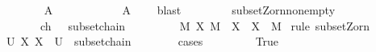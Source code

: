 \begin{isabellebody}
\ \ \ \ \ \ \isamarkupfalse%
\ {\isachardoublequoteopen}A\ {\isasymsubseteq}\ {\isasymUnion}{\isasymF}{\isachardoublequoteclose}\isanewline
\ \ \ \ \ \ \ \ \isamarkupfalse%
\ {\isacartoucheopen}A\ {\isasymsubseteq}\ {\isasymUnion}{\isasymF}{\isacartoucheclose}\ \isamarkupfalse%
\ blast\isanewline
\ \ \ \ \isamarkupfalse%
\isanewline
\ \ \isamarkupfalse%
\isanewline
{}\isamarkupfalse%
%
\endisatagproof
{\isafoldproof}%
%
\isadelimproof
\isanewline
%
\endisadelimproof
\isanewline
{}\isamarkupfalse%
\ subset{\isacharunderscore}{\kern0pt}Zorn{\isacharunderscore}{\kern0pt}nonempty{\isacharcolon}{\kern0pt}\isanewline
\ \ \ {\isachardoublequoteopen}{\isasymA}\ {\isasymnoteq}\ {\isacharbraceleft}{\kern0pt}{\isacharbraceright}{\kern0pt}{\isachardoublequoteclose}\ \ ch{\isacharcolon}{\kern0pt}\ {\isachardoublequoteopen}{\isasymAnd}{\isasymC}{\isachardot}{\kern0pt}\ {\isasymlbrakk}{\isasymC}{\isasymnoteq}{\isacharbraceleft}{\kern0pt}{\isacharbraceright}{\kern0pt}{\isacharsemicolon}{\kern0pt}\ subset{\isachardot}{\kern0pt}chain\ {\isasymA}\ {\isasymC}{\isasymrbrakk}\ {\isasymLongrightarrow}\ {\isasymUnion}{\isasymC}\ {\isasymin}\ {\isasymA}{\isachardoublequoteclose}\isanewline
\ \ \ {\isachardoublequoteopen}{\isasymexists}M{\isasymin}{\isasymA}{\isachardot}{\kern0pt}\ {\isasymforall}X{\isasymin}{\isasymA}{\isachardot}{\kern0pt}\ M\ {\isasymsubseteq}\ X\ {\isasymlongrightarrow}\ X\ {\isacharequal}{\kern0pt}\ M{\isachardoublequoteclose}\isanewline
%
\isadelimproof
%
\endisadelimproof
%
\isatagproof
{}\isamarkupfalse%
\ {\isacharparenleft}{\kern0pt}rule\ subset{\isacharunderscore}{\kern0pt}Zorn{\isacharparenright}{\kern0pt}\isanewline
\ \ \isamarkupfalse%
\ {\isachardoublequoteopen}{\isasymexists}U{\isasymin}{\isasymA}{\isachardot}{\kern0pt}\ {\isasymforall}X{\isasymin}{\isasymC}{\isachardot}{\kern0pt}\ X\ {\isasymsubseteq}\ U{\isachardoublequoteclose}\ \ {\isachardoublequoteopen}subset{\isachardot}{\kern0pt}chain\ {\isasymA}\ {\isasymC}{\isachardoublequoteclose}\ \ {\isasymC}\isanewline
\ \ \isamarkupfalse%
\ {\isacharparenleft}{\kern0pt}cases\ {\isachardoublequoteopen}{\isasymC}\ {\isacharequal}{\kern0pt}\ {\isacharbraceleft}{\kern0pt}{\isacharbraceright}{\kern0pt}{\isachardoublequoteclose}{\isacharparenright}{\kern0pt}\isanewline
\ \ \ \ \isamarkupfalse%
\ True\isanewline
\ \ \ \ \isamarkupfalse%

\end{isabellebody}

